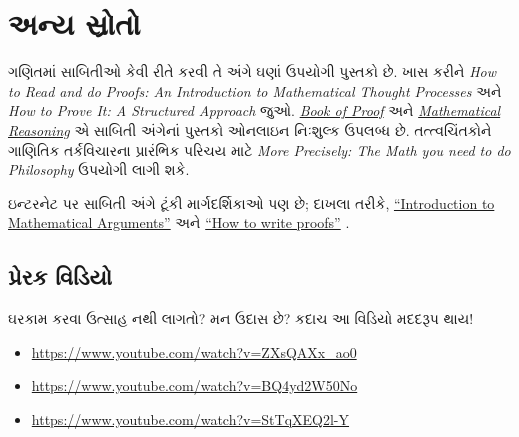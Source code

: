 \documentclass[../../../include/open-logic-section]{subfiles}
\begin{document}

\section{અન્ય સ્રોતો}

ગણિતમાં સાબિતીઓ કેવી રીતે કરવી તે અંગે ઘણાં ઉપયોગી પુસ્તકો
છે. ખાસ કરીને \emph{How to Read and do Proofs: An Introduction to
Mathematical Thought Processes} \citep{Solow2013} અને \emph{How to
Prove It: A Structured Approach} \citep{Velleman2019} જુઓ.
\href{http://www.people.vcu.edu/~rhammack/BookOfProof/BookOfProof.pdf}{\emph{Book
of Proof}} \citep{Hammack2013} અને
\href{https://scholarworks.gvsu.edu/books/7/}{\emph{Mathematical
Reasoning}} \citep{Sandstrum2019} એ સાબિતી અંગેનાં પુસ્તકો
ઓનલાઇન નિઃશુલ્ક ઉપલબ્ધ છે. તત્ત્વચિંતકોને ગાણિતિક તર્કવિચારના
પ્રારંભિક પરિચય માટે
\emph{More
Precisely: The Math you need to do Philosophy} \citep{Steinhart2018}
ઉપયોગી લાગી શકે.

ઇન્ટરનેટ પર સાબિતી અંગે ટૂંકી માર્ગદર્શિકાઓ પણ છે;
દાખલા તરીકે,
\href{https://math.berkeley.edu/~hutching/teach/proofs.pdf}{``Introduction
  to Mathematical Arguments''} \citep{Hutchings2003} અને
\href{https://eugeniacheng.com/wp-content/uploads/2017/02/cheng-proofguide.pdf}{``How to
  write proofs''} \citep{Cheng2004}.

\subsection{પ્રેરક વિડિયો}

ઘરકામ કરવા ઉત્સાહ નથી લાગતો? મન ઉદાસ છે? કદાચ આ વિડિયો
મદદરૂપ થાય!

\begin{itemize}
\item \url{https://www.youtube.com/watch?v=ZXsQAXx_ao0}
\item \url{https://www.youtube.com/watch?v=BQ4yd2W50No}
\item \url{https://www.youtube.com/watch?v=StTqXEQ2l-Y}
\end{itemize}
\end{document}
